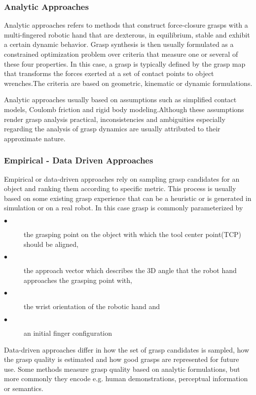 \subsubsection{Analytic Approaches}
\par
Analytic approaches refers to methods that construct force-closure grasps with a  multi-fingered robotic hand that are dexterous, in equilibrium, stable and exhibit a certain dynamic behavior. Grasp synthesis is then usually formulated as a constrained  optimization problem over criteria that measure one or several of these four properties. In this case, a grasp is typically defined by the grasp map that transforms the forces exerted at a set of contact points to object wrenches.The criteria are based on  geometric, kinematic or dynamic formulations. 
\par
Analytic approaches usually based on assumptions such as simplified contact models, Coulomb friction and rigid body modeling.Although these assumptions render grasp analysis practical, inconsistencies and  ambiguities especially regarding the analysis of grasp dynamics are usually attributed
to their approximate nature.

\par
\subsubsection{Empirical - Data Driven Approaches}
\par
Empirical or data-driven approaches rely on sampling grasp candidates for an object and  ranking them according to specific metric. This process is usually based on some existing
grasp experience that can be a heuristic or is generated in simulation or on a real  robot. In this case grasp is commonly parameterized by
\begin{description}
\item [$\bullet$ ]the grasping point on the object with which the tool center point(TCP) should be aligned,
\item [$\bullet$ ]the approach  vector which  describes the 3D angle that the robot hand approaches the grasping point with,
\item [$\bullet$ ]the wrist orientation of the robotic hand and 
\item [$\bullet$ ]an initial finger configuration
\end{description}
Data-driven approaches differ in how the set of grasp candidates is sampled, how the grasp quality is estimated and how good  grasps are represented for future use. Some  methods measure grasp quality based on analytic formulations,  but more commonly they  encode e.g. human demonstrations, perceptual information or semantics.
\par
